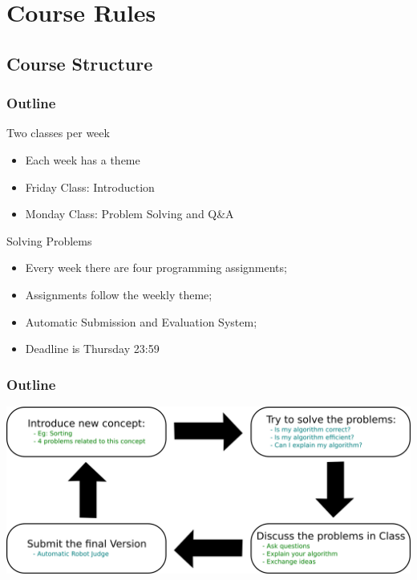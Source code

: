 \documentclass{beamer}
\begin{document}
\section{Course Rules}
\subsection{Course Structure}

\begin{frame}
    \frametitle{Outline}
    
    \begin{block}{Two classes per week}
        \begin{itemize}   
        \item Each week has a theme
        \item Friday Class: Introduction
        \item Monday Class: Problem Solving and Q\&A
        \end{itemize}
    \end{block}
    
    \begin{block}{Solving Problems}
        \begin{itemize}
        \item Every week there are four programming assignments;
        \item Assignments follow the weekly theme;
        \item Automatic Submission and Evaluation System;
        \item Deadline is Thursday 23:59
        \end{itemize}   
    \end{block}
\end{frame}
    
\begin{frame}
  \frametitle{Outline}
  \begin{center}
    \includegraphics[width=1\textwidth]{../img/classoutline}
  \end{center}
\end{frame}
\end{document}
